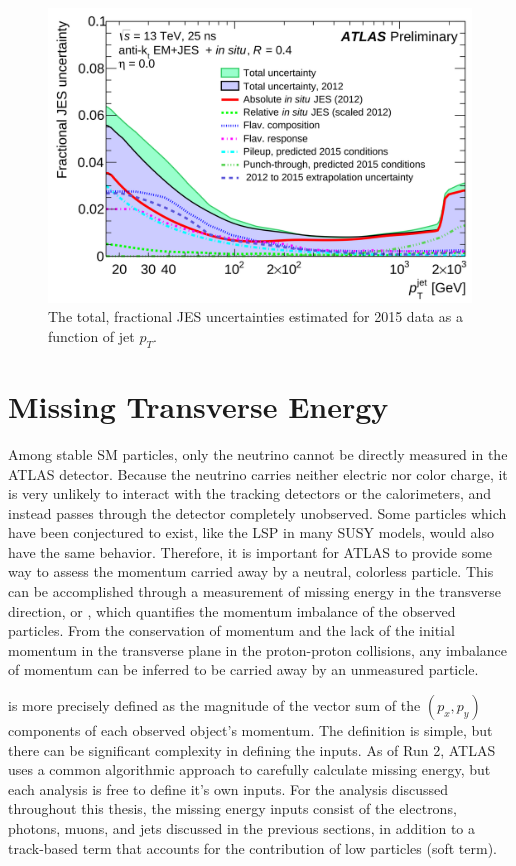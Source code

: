 \begin{figure}
\includegraphics[width=\fullfig]{figures/reco_jes_pt.png}
\caption{The total, fractional \acs*{JES} uncertainties estimated for 2015 data as a function of jet $p_T$.}
\label{fig:reco_jesunc}
\end{figure}


\section{Missing Transverse Energy}
\label{sec:missing_energy}

Among stable \ac{SM} particles, only the neutrino cannot be directly measured in the ATLAS detector. 
Because the neutrino carries neither electric nor color charge, it is very unlikely to interact with the tracking detectors or the calorimeters, and instead passes through the detector completely unobserved.
Some particles which have been conjectured to exist, like the \ac{LSP} in many \ac{SUSY} models, would also have the same behavior.
Therefore, it is important for ATLAS to provide some way to assess the momentum carried away by a neutral, colorless particle.
This can be accomplished through a measurement of missing energy in the transverse direction, or \met, which quantifies the momentum imbalance of the observed particles.
From the conservation of momentum and the lack of the initial momentum in the transverse plane in the proton-proton collisions, any imbalance of momentum can be inferred to be carried away by an unmeasured particle.

\met is more precisely defined as the magnitude of the vector sum of the $(p_x,p_y)$ components of each observed object's momentum.
The definition is simple, but there can be significant complexity in defining the inputs.
As of Run 2, ATLAS uses a common algorithmic approach to carefully calculate missing energy, but each analysis is free to define it's own inputs.
For the analysis discussed throughout this thesis, the missing energy inputs consist of the electrons, photons, muons, and jets discussed in the previous sections, in addition to a track-based term that accounts for the contribution of low \pt particles (soft term).

